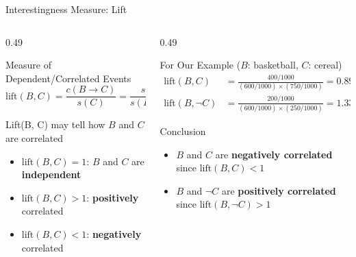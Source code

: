 \documentclass[aspectratio=169, 11pt]{beamer}
\begin{document}
\begin{frame}{Interestingness Measure: Lift}
    \begin{columns}[T]
        \begin{column}{0.49\textwidth}
            \footnotesize
            \begin{block}{Measure of Dependent/Correlated Events}
                \[
                    \text{lift}(B, C) = \frac{c(B \rightarrow C)}{s(C)} = \frac{s(B \cup C)}{s(B) \times s(C)}
                \]
            \end{block}
            \vspace{0.1cm}
            \begin{block}{Lift(B, C) may tell how $B$ and $C$ are correlated}
                \begin{itemize}
                    \item $\text{lift}(B, C) = 1$: $B$ and $C$ are \textbf{independent}
                    \item $\text{lift}(B, C) > 1$: \textbf{positively} correlated
                    \item $\text{lift}(B, C) < 1$: \textbf{negatively} correlated
                \end{itemize}
            \end{block}
        \end{column}
        \begin{column}{0.49\textwidth}
            \footnotesize
            \begin{exampleblock}{For Our Example ($B$: basketball, $C$: cereal)}
                \vspace{-0.2cm}
                \begin{align*}
                    \text{lift}(B, C) &= \frac{400 / 1000}{(600 / 1000) \times (750 / 1000)} = \mathbf{0.89} \\[0.2cm]
                    \text{lift}(B, \neg C) &= \frac{200 / 1000}{(600 / 1000) \times (250 / 1000)} = \mathbf{1.33}
                \end{align*}
            \end{exampleblock}
            \vspace{0.1cm}
            \begin{alertblock}{Conclusion}
                \footnotesize
                \begin{itemize}
                    \item $B$ and $C$ are \textbf{negatively correlated} since $\text{lift}(B, C) < 1$
                    \item $B$ and $\neg C$ are \textbf{positively correlated} since $\text{lift}(B, \neg C) > 1$
                \end{itemize}
            \end{alertblock}
        \end{column}
    \end{columns}
\end{frame}
\end{document}
